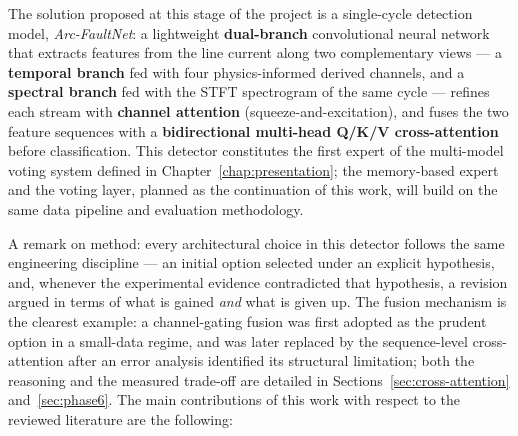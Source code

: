 The solution proposed at this stage of the project is a single-cycle detection model, \emph{Arc-FaultNet}: a lightweight \textbf{dual-branch} convolutional neural network that extracts features from the line current along two complementary views --- a \textbf{temporal branch} fed with four physics-informed derived channels, and a \textbf{spectral branch} fed with the STFT spectrogram of the same cycle --- refines each stream with \textbf{channel attention} (squeeze-and-excitation), and fuses the two feature sequences with a \textbf{bidirectional multi-head Q/K/V cross-attention} before classification. This detector constitutes the first expert of the multi-model voting system defined in Chapter~\ref{chap:presentation}; the memory-based expert and the voting layer, planned as the continuation of this work, will build on the same data pipeline and evaluation methodology.

\medskip

A remark on method: every architectural choice in this detector follows the same engineering discipline --- an initial option selected under an explicit hypothesis, and, whenever the experimental evidence contradicted that hypothesis, a revision argued in terms of what is gained \emph{and} what is given up. The fusion mechanism is the clearest example: a channel-gating fusion was first adopted as the prudent option in a small-data regime, and was later replaced by the sequence-level cross-attention after an error analysis identified its structural limitation; both the reasoning and the measured trade-off are detailed in Sections~\ref{sec:cross-attention} and~\ref{sec:phase6}. The main contributions of this work with respect to the reviewed literature are the following:

